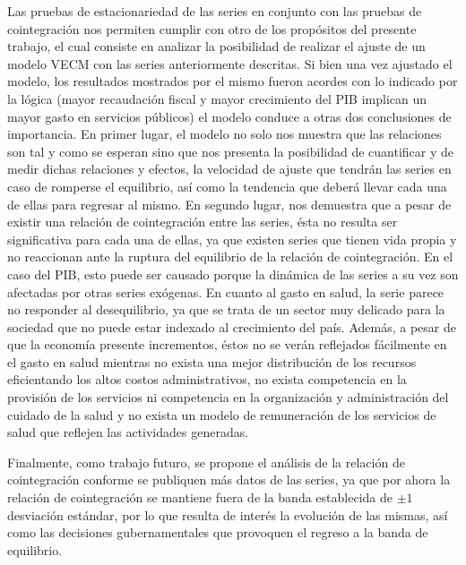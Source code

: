 Las pruebas de estacionariedad de las series en conjunto con las pruebas de cointegración nos permiten cumplir con otro de los propósitos del presente trabajo, el cual consiste en analizar la posibilidad de realizar el ajuste de un modelo VECM con las series anteriormente descritas. Si bien una vez ajustado el modelo, los resultados mostrados por el mismo fueron acordes con lo indicado por la lógica (mayor recaudación fiscal y mayor crecimiento del PIB implican un mayor gasto en servicios públicos) el modelo conduce a otras dos conclusiones de importancia. En primer lugar, el modelo no solo nos muestra que las relaciones son tal y como se esperan sino que nos presenta la posibilidad de cuantificar y de medir dichas relaciones y efectos, la velocidad de ajuste que tendrán las series en caso de romperse el equilibrio, así como la tendencia que deberá llevar cada una de ellas para regresar al mismo. En segundo lugar, nos demuestra que a pesar de existir una relación de cointegración entre las series, ésta no resulta ser significativa para cada una de ellas, ya que existen series que tienen vida propia y no reaccionan ante la ruptura del equilibrio de la relación de cointegración. En el caso del PIB, esto puede ser causado porque la dinámica de las series a su vez son afectadas por otras series exógenas. En cuanto al gasto en salud, la serie parece no responder al desequilibrio, ya que se trata de un sector muy delicado para la sociedad que no puede estar indexado al crecimiento del país. Además,  a pesar de que la economía presente incrementos, éstos no se verán reflejados fácilmente en el gasto en salud mientras no exista una mejor distribución de los recursos eficientando los altos costos administrativos, no exista competencia en la provisión de los servicios ni competencia en la organización y administración del cuidado de la salud y no exista un modelo de remuneración de los servicios de salud que reflejen las actividades generadas.\bigskip


Finalmente, como trabajo futuro, se propone el análisis de la relación de cointegración conforme se publiquen más datos de las series, ya que por ahora la relación de cointegración se mantiene fuera de la banda establecida de $\pm 1$ desviación estándar, por lo que resulta de interés la evolución de las mismas, así como las decisiones gubernamentales que provoquen el regreso a la banda de equilibrio.\bigskip
